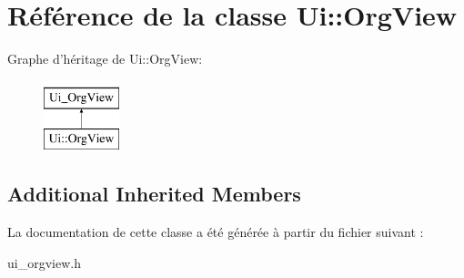 \section{Référence de la classe Ui\-:\-:Org\-View}
\label{class_ui_1_1_org_view}
Graphe d'héritage de Ui\-:\-:Org\-View\-:\begin{figure}[H]
\begin{center}
\leavevmode
\includegraphics[height=2.000000cm]{class_ui_1_1_org_view}
\end{center}
\end{figure}
\subsection*{Additional Inherited Members}


La documentation de cette classe a été générée à partir du fichier suivant \-:\begin{DoxyCompactItemize}
\item 
ui\-\_\-orgview.\-h\end{DoxyCompactItemize}
